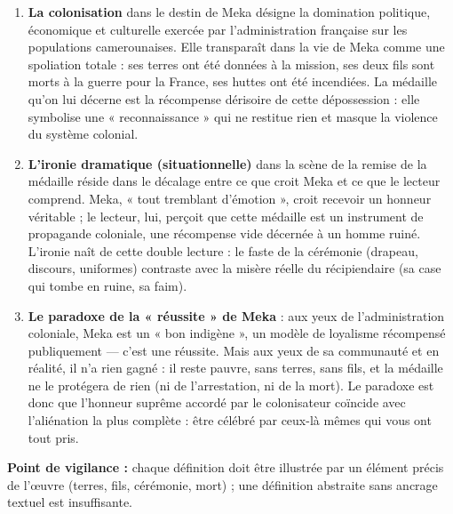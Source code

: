 \documentclass[11pt]{article}
\begin{document}
\begin{corrige}
\begin{enumerate}
\item \textbf{La colonisation} dans le destin de Meka désigne la domination politique, économique et culturelle exercée par l'administration française sur les populations camerounaises. Elle transparaît dans la vie de Meka comme une spoliation totale : ses terres ont été données à la mission, ses deux fils sont morts à la guerre pour la France, ses huttes ont été incendiées. La médaille qu'on lui décerne est la récompense dérisoire de cette dépossession : elle symbolise une « reconnaissance » qui ne restitue rien et masque la violence du système colonial.
\item \textbf{L'ironie dramatique (situationnelle)} dans la scène de la remise de la médaille réside dans le décalage entre ce que croit Meka et ce que le lecteur comprend. Meka, « tout tremblant d'émotion », croit recevoir un honneur véritable ; le lecteur, lui, perçoit que cette médaille est un instrument de propagande coloniale, une récompense vide décernée à un homme ruiné. L'ironie naît de cette double lecture : le faste de la cérémonie (drapeau, discours, uniformes) contraste avec la misère réelle du récipiendaire (sa case qui tombe en ruine, sa faim).
\item \textbf{Le paradoxe de la « réussite » de Meka} : aux yeux de l'administration coloniale, Meka est un « bon indigène », un modèle de loyalisme récompensé publiquement — c'est une réussite. Mais aux yeux de sa communauté et en réalité, il n'a rien gagné : il reste pauvre, sans terres, sans fils, et la médaille ne le protégera de rien (ni de l'arrestation, ni de la mort). Le paradoxe est donc que l'honneur suprême accordé par le colonisateur coïncide avec l'aliénation la plus complète : être célébré par ceux-là mêmes qui vous ont tout pris.
\end{enumerate}
\textbf{Point de vigilance :} chaque définition doit être illustrée par un élément précis de l'œuvre (terres, fils, cérémonie, mort) ; une définition abstraite sans ancrage textuel est insuffisante.
\end{corrige}
\end{document}
